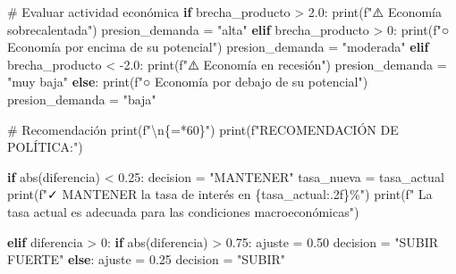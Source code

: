 \documentclass[
  doc,
  floatsintext,
  longtable,
  a4paper,
  nolmodern,
  notxfonts,
  notimes,
  12pt,
  colorlinks=true,linkcolor=blue,citecolor=blue,urlcolor=blue]{apa7}
\newenvironment{Shaded}{\begin{snugshade}}{\end{snugshade}}
\newcommand{\BuiltInTok}[1]{\textcolor[rgb]{0.00,0.23,0.31}{#1}}
\newcommand{\CharTok}[1]{\textcolor[rgb]{0.13,0.47,0.30}{#1}}
\newcommand{\CommentTok}[1]{\textcolor[rgb]{0.37,0.37,0.37}{#1}}
\newcommand{\ControlFlowTok}[1]{\textcolor[rgb]{0.00,0.23,0.31}{\textbf{#1}}}
\newcommand{\DecValTok}[1]{\textcolor[rgb]{0.68,0.00,0.00}{#1}}
\newcommand{\FloatTok}[1]{\textcolor[rgb]{0.68,0.00,0.00}{#1}}
\newcommand{\NormalTok}[1]{\textcolor[rgb]{0.00,0.23,0.31}{#1}}
\newcommand{\OperatorTok}[1]{\textcolor[rgb]{0.37,0.37,0.37}{#1}}
\newcommand{\SpecialCharTok}[1]{\textcolor[rgb]{0.37,0.37,0.37}{#1}}
\newcommand{\SpecialStringTok}[1]{\textcolor[rgb]{0.13,0.47,0.30}{#1}}
\newcommand{\StringTok}[1]{\textcolor[rgb]{0.13,0.47,0.30}{#1}}
\begin{document}
\begin{Shaded}
\begin{Highlighting}[]
        \CommentTok{\# Evaluar actividad económica}
        \ControlFlowTok{if}\NormalTok{ brecha\_producto }\OperatorTok{\textgreater{}} \FloatTok{2.0}\NormalTok{:}
            \BuiltInTok{print}\NormalTok{(}\SpecialStringTok{f"⚠️  Economía sobrecalentada"}\NormalTok{)}
\NormalTok{            presion\_demanda }\OperatorTok{=} \StringTok{"alta"}
        \ControlFlowTok{elif}\NormalTok{ brecha\_producto }\OperatorTok{\textgreater{}} \DecValTok{0}\NormalTok{:}
            \BuiltInTok{print}\NormalTok{(}\SpecialStringTok{f"○ Economía por encima de su potencial"}\NormalTok{)}
\NormalTok{            presion\_demanda }\OperatorTok{=} \StringTok{"moderada"}
        \ControlFlowTok{elif}\NormalTok{ brecha\_producto }\OperatorTok{\textless{}} \OperatorTok{{-}}\FloatTok{2.0}\NormalTok{:}
            \BuiltInTok{print}\NormalTok{(}\SpecialStringTok{f"⚠️  Economía en recesión"}\NormalTok{)}
\NormalTok{            presion\_demanda }\OperatorTok{=} \StringTok{"muy baja"}
        \ControlFlowTok{else}\NormalTok{:}
            \BuiltInTok{print}\NormalTok{(}\SpecialStringTok{f"○ Economía por debajo de su potencial"}\NormalTok{)}
\NormalTok{            presion\_demanda }\OperatorTok{=} \StringTok{"baja"}
        
        \CommentTok{\# Recomendación}
        \BuiltInTok{print}\NormalTok{(}\SpecialStringTok{f"}\CharTok{\textbackslash{}n}\SpecialCharTok{\{}\StringTok{\textquotesingle{}=\textquotesingle{}}\OperatorTok{*}\DecValTok{60}\SpecialCharTok{\}}\SpecialStringTok{"}\NormalTok{)}
        \BuiltInTok{print}\NormalTok{(}\SpecialStringTok{f"RECOMENDACIÓN DE POLÍTICA:"}\NormalTok{)}
        
        \ControlFlowTok{if} \BuiltInTok{abs}\NormalTok{(diferencia) }\OperatorTok{\textless{}} \FloatTok{0.25}\NormalTok{:}
\NormalTok{            decision }\OperatorTok{=} \StringTok{"MANTENER"}
\NormalTok{            tasa\_nueva }\OperatorTok{=}\NormalTok{ tasa\_actual}
            \BuiltInTok{print}\NormalTok{(}\SpecialStringTok{f"✓ MANTENER la tasa de interés en }\SpecialCharTok{\{}\NormalTok{tasa\_actual}\SpecialCharTok{:.2f\}}\SpecialStringTok{\%"}\NormalTok{)}
            \BuiltInTok{print}\NormalTok{(}\SpecialStringTok{f"  La tasa actual es adecuada para las condiciones macroeconómicas"}\NormalTok{)}
        
        \ControlFlowTok{elif}\NormalTok{ diferencia }\OperatorTok{\textgreater{}} \DecValTok{0}\NormalTok{:}
            \ControlFlowTok{if} \BuiltInTok{abs}\NormalTok{(diferencia) }\OperatorTok{\textgreater{}} \FloatTok{0.75}\NormalTok{:}
\NormalTok{                ajuste }\OperatorTok{=} \FloatTok{0.50}
\NormalTok{                decision }\OperatorTok{=} \StringTok{"SUBIR FUERTE"}
            \ControlFlowTok{else}\NormalTok{:}
\NormalTok{                ajuste }\OperatorTok{=} \FloatTok{0.25}
\NormalTok{                decision }\OperatorTok{=} \StringTok{"SUBIR"}
            

\end{Highlighting}
\end{Shaded}
\end{document}
